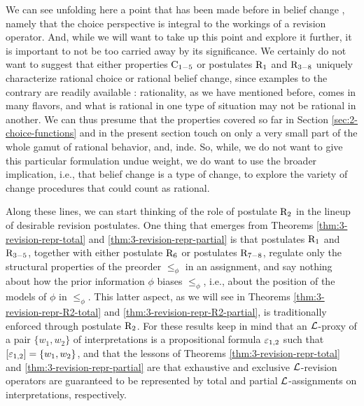 We can see unfolding here 
a point that has been made before in belief change
\cite{Rott92,Schulte99,Rott01,Bonanno09,Arlo-CostaP10}, 
namely that the choice perspective 
is integral to the workings of a revision operator.
And, while we will want to take up this point and explore it further,
it is important to not be too carried away by its significance.
We certainly do not want to suggest that either 
properties $\mathrm{C}_{1-5}$ or postulates $\mathrm{R}_{1}$ and $\mathrm{R}_{3-8}$
uniquely characterize rational choice or rational belief change,
since examples to the contrary are readily available 
\cite{Sen77,Olsson03,Kahneman11}: rationality, as we have mentioned before, 
comes in many flavors, and what is rational in one type of situation 
may not be rational in another.
We can thus presume that the properties covered
so far in Section \ref{sec:2-choice-functions} and in the present section 
touch on only a very small part of 
the whole gamut of rational behavior,
and, inde. 
So, while, we do not want to give this particular formulation 
undue weight, we do want to use the broader implication, 
i.e., that belief change is a type of change, 
to explore the variety of change procedures 
that could count as rational.

Along these lines, we can start thinking of the role of postulate $\mathrm{R}_{2}$
in the lineup of desirable revision postulates.
One thing that emerges from
Theorems \ref{thm:3-revision-repr-total} and \ref{thm:3-revision-repr-partial} 
is that postulates $\mathrm{R}_{1}$ and $\mathrm{R}_{3-5}$,
together with either postulate $\mathrm{R}_{6}$ or postulates $\mathrm{R}_{7-8}$,
regulate only the structural properties of the preorder $\le_{\phi}$ 
in an assignment, 
and say nothing about how the prior information $\phi$ 
biases $\le_{\phi}$, 
i.e., about the position of the models of $\phi$ in $\le_\phi$.
This latter aspect, as we will see in Theorems \ref{thm:3-revision-repr-R2-total}
and \ref{thm:3-revision-repr-R2-partial}, 
is traditionally enforced through postulate $\mathrm{R}_{2}$.
For these results keep in mind 
that an $\mathcal{L}$-proxy of a pair 
$\{w_1,w_2\}$ of interpretations is a propositional formula $\varepsilon_{1,2}$ 
such that $[\varepsilon_{1,2}]=\{w_1,w_2\}$,
and that the lessons of 
Theorems \ref{thm:3-revision-repr-total} and \ref{thm:3-revision-repr-partial}
are that exhaustive and exclusive $\mathcal{L}$-revision operators 
are guaranteed to be represented by total and partial $\mathcal{L}$-assignments 
on interpretations, respectively.

